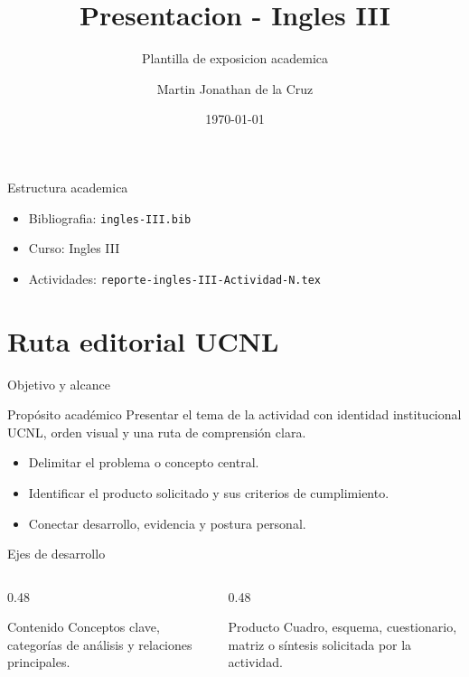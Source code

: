 ﻿\documentclass[spanish,aspectratio=169]{beamer}
\title{Presentacion - Ingles III}
\subtitle{Plantilla de exposicion academica}
\author{Martin Jonathan de la Cruz}
\institute{Universidad Ciudadana de Nuevo Leon}
\date{\today}
\begin{document}
\begin{frame}
  \titlepage
\end{frame}

\begin{frame}{Estructura academica}
  \begin{itemize}
    \item Bibliografia: \texttt{ingles-III.bib}
    \item Curso: Ingles III
    \item Actividades: \texttt{reporte-ingles-III-Actividad-N.tex}
  \end{itemize}
\end{frame}


\section{Ruta editorial UCNL}

\begin{frame}{Objetivo y alcance}
  \begin{block}{Propósito académico}
    Presentar el tema de la actividad con identidad institucional UCNL, orden visual y una ruta de comprensión clara.
  \end{block}
  \begin{itemize}
    \item Delimitar el problema o concepto central.
    \item Identificar el producto solicitado y sus criterios de cumplimiento.
    \item Conectar desarrollo, evidencia y postura personal.
  \end{itemize}
\end{frame}

\begin{frame}{Ejes de desarrollo}
  \begin{columns}[T,totalwidth=\textwidth]
    \begin{column}{0.48\textwidth}
      \begin{block}{Contenido}
        Conceptos clave, categorías de análisis y relaciones principales.
      \end{block}
    \end{column}
    \begin{column}{0.48\textwidth}
      \begin{block}{Producto}
        Cuadro, esquema, cuestionario, matriz o síntesis solicitada por la actividad.
      \end{block}
    \end{column}
  \end{columns}
\end{frame}
\end{document}
